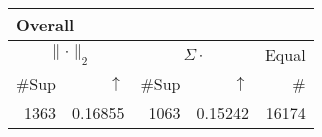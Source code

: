 \begin{center}
\renewcommand{\tabcolsep}{4pt}
\renewcommand{\arraystretch}{1.1}
\begin{customnormal}
\begin{tabular}{rrrrr}
\multicolumn{5}{l}{Overall}\\
\toprule
\multicolumn{2}{c}{$\lVert \cdot \rVert_2$} & \multicolumn{2}{c}{$\Sigma \cdot$} & \multicolumn{1}{c}{Equal} \\ 
\cmidrule(lr){1-2} \cmidrule(lr){3-4} \cmidrule(lr){5-5}
\#Sup & $\uparrow$ & \#Sup & $\uparrow$ & \# \\ 
\midrule
1363 & 0.16855  & 1063 & 0.15242  & 16174 \\ 
\bottomrule
\end{tabular}


\end{customnormal}
\end{center}



